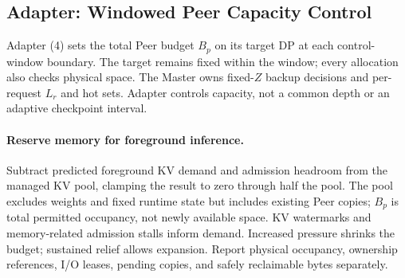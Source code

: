 \subsection{Adapter: Windowed Peer Capacity Control}
\label{sec:kv-runtime}
\label{sec:capacity-allocation}

Adapter (4) sets the total Peer budget $B_p$ on its target DP at each
control-window boundary. The target remains fixed within the window;
every allocation also checks physical space. The Master owns fixed-$Z$
backup decisions and per-request $L_r$ and hot sets. Adapter controls
capacity, not a common depth or an adaptive checkpoint interval.

\paragraph{Reserve memory for foreground inference.}
Subtract predicted foreground KV demand and admission headroom from the
managed KV pool, clamping the result to zero through half the pool.
The pool excludes weights and fixed runtime state but includes existing
Peer copies; $B_p$ is total permitted occupancy, not newly available space.
KV watermarks and memory-related admission stalls inform demand.
Increased pressure shrinks the budget; sustained relief allows expansion.
Report physical occupancy, ownership references, I/O leases, pending
copies, and safely reclaimable bytes separately.

